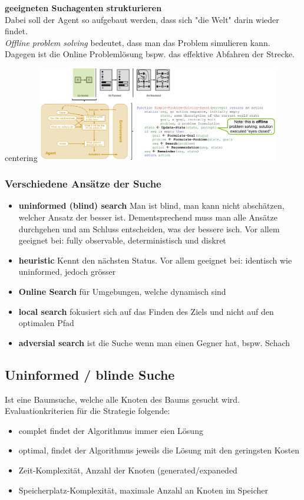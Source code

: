 \documentclass{article}
\newenvironment{Figure}
	{\par\medskip\noindent\minipage{\linewidth}}
	{\endminipage\par\medskip}
\theoremstyle{merke}
\theoremstyle{definition}
\begin{document}
\textbf{geeigneten Suchagenten strukturieren}\\
Dabei soll der Agent so aufgebaut werden, dass sich "die Welt" darin wieder findet.\\
\textit{Offline problem solving} bedeutet, dass man das Problem simulieren kann. Dagegen ist die Online Problemlösung bspw. das effektive Abfahren der Strecke.
\begin{Figure}
centering
\includegraphics[width=400px]{img/suitableAgentStructure.png}
	\label{fig:Möglicher Aufbau eines modellbasierten Agenten}
\end{Figure}

\subsubsection{Verschiedene Ansätze der Suche}
\begin{itemize}
\item{\textbf{uninformed (blind) search} Man ist blind, man kann nicht abschätzen, welcher Ansatz der besser ist. Dementsprechend muss man alle Ansätze durchgehen und am Schluss entscheiden, was der bessere isch. Vor allem geeignet bei: fully observable, deterministisch und diskret}
\item{\textbf{heuristic} Kennt den nächsten Status. Vor allem geeignet bei: identisch wie uninformed, jedoch grösser}
\item{\textbf{Online Search} für Umgebungen, welche dynamisch sind}
\item{\textbf{local search} fokusiert sich auf das Finden des Ziels und nicht auf den optimalen Pfad}
\item{\textbf{adversial search} ist die Suche wenn man einen Gegner hat, bspw. Schach} 
\end{itemize}

\subsection{Uninformed / blinde Suche}
Ist eine Baumsuche, welche alle Knoten des Baums gesucht wird. Evaluationkriterien für die Strategie folgende:
\begin{itemize}
\item{complet findet der Algorithmus immer eien Lösung}
\item{optimal, findet der Algorithmus jeweils die Lösung mit den geringsten Kosten}
\item{Zeit-Komplexität, Anzahl der Knoten (generated/expaneded}
\item{Speicherplatz-Komplexität, maximale Anzahl an Knoten im Speicher}
\end{itemize}
\end{document}
